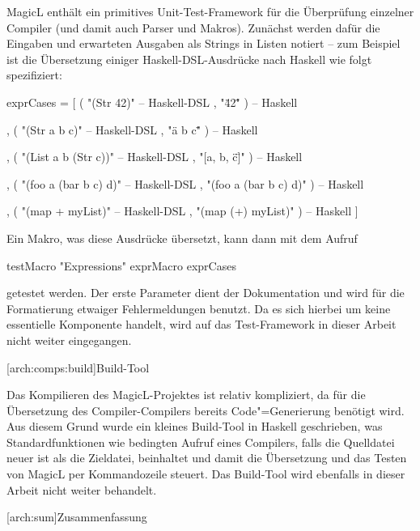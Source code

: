 \documentclass[12pt, a4paper, bibgerm]{scrbook}
\newenvironment{DIFnomarkup}{}{}
\newcommand\lsection{}
\newcommand\lsubsection{}
\newcommand{\cgen}{Code"=Generierung}
\begin{document}
MagicL enthält ein primitives Unit-Test-Framework für die Überprüfung
einzelner Compiler (und damit auch Parser und Makros). Zunächst werden
dafür die Eingaben und erwarteten Ausgaben als Strings in Listen
notiert -- zum Beispiel ist die Übersetzung einiger Haskell-DSL-Ausdrücke
nach Haskell wie folgt spezifiziert:
\begin{DIFnomarkup}\begin{code}
exprCases = [ ( "(Str 42)"                    -- Haskell-DSL 
                , "\"42\"" )                  -- Haskell 

              , ( "(Str a  b c)"              -- Haskell-DSL 
                , "\"a b c\"" )               -- Haskell 

              , ( "(List a b (Str c))"        -- Haskell-DSL 
                , "[a, b, \"c\"]" )           -- Haskell 

              , ( "(foo a (bar b c) d)"       -- Haskell-DSL 
                , "(foo a (bar b c) d)" )     -- Haskell 

              , ( "(map + myList)"            -- Haskell-DSL 
                , "(map (+) myList)" )        -- Haskell 
              ]
\end{code}\end{DIFnomarkup}

Ein Makro, was diese Ausdrücke übersetzt, kann dann mit dem Aufruf
\begin{DIFnomarkup}\begin{code}
testMacro "Expressions" exprMacro exprCases  
\end{code}\end{DIFnomarkup}
getestet werden. Der erste Parameter dient der Dokumentation und wird
für die Formatierung etwaiger Fehlermeldungen benutzt. Da es sich
hierbei um keine essentielle Komponente handelt, wird auf das
Test-Framework in dieser Arbeit nicht weiter eingegangen.

\lsubsection[arch:comps:build]{Build-Tool}

Das Kompilieren des MagicL-Projektes ist relativ kompliziert, da für die
Übersetzung des Compiler-Compilers bereits \cgen{} benötigt wird. Aus
diesem Grund wurde ein kleines Build-Tool in Haskell geschrieben, was
Standardfunktionen wie bedingten Aufruf eines Compilers, falls die
Quelldatei neuer ist als die Zieldatei, beinhaltet und damit die
Übersetzung und das Testen von MagicL per Kommandozeile steuert. Das
Build-Tool wird ebenfalls in dieser Arbeit nicht weiter behandelt.

\lsection[arch:sum]{Zusammenfassung}
\end{document}
